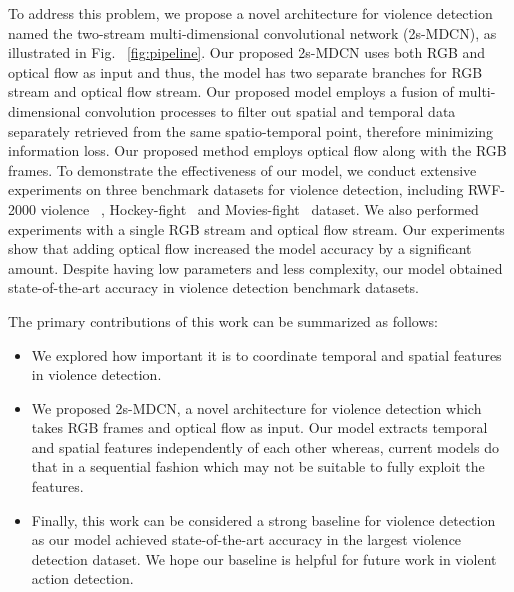 To address this problem, we propose a novel architecture for violence detection named the two-stream multi-dimensional convolutional network (2s-MDCN), as illustrated in Fig. ~\ref{fig:pipeline}.
Our proposed 2s-MDCN uses both RGB and optical flow as input and thus, the model has two separate branches for RGB stream and optical flow stream.
Our proposed model employs a fusion of multi-dimensional convolution processes to filter out spatial and temporal data separately retrieved from the same spatio-temporal point, therefore minimizing information loss.
Our proposed method employs optical flow along with the RGB frames.
To demonstrate the effectiveness of our model, we conduct extensive experiments on three benchmark datasets for violence detection, including RWF-2000 violence ~\cite{cheng2019rwf}, Hockey-fight~\cite{hockey_nievas2011violence} and Movies-fight~\cite{movie_nievas2011violence} dataset.
We also performed experiments with a single RGB stream and optical flow stream. Our experiments show that adding optical flow increased the model accuracy by a significant amount.
Despite having low parameters and less complexity, our model obtained state-of-the-art accuracy in violence detection benchmark datasets.

The primary contributions of this work can be summarized as follows:
\begin{itemize}
    \item We explored how important it is to coordinate temporal and spatial features in violence detection.
    \item We proposed 2s-MDCN, a novel architecture for violence detection which takes RGB frames and optical flow as input. Our model extracts temporal and spatial features independently of each other whereas, current models do that in a sequential fashion which may not be suitable to fully exploit the features.
    \item Finally, this work can be considered a strong baseline for violence detection as our model achieved state-of-the-art accuracy in the largest violence detection dataset. We hope our baseline is helpful for future work in violent action detection.
\end{itemize}